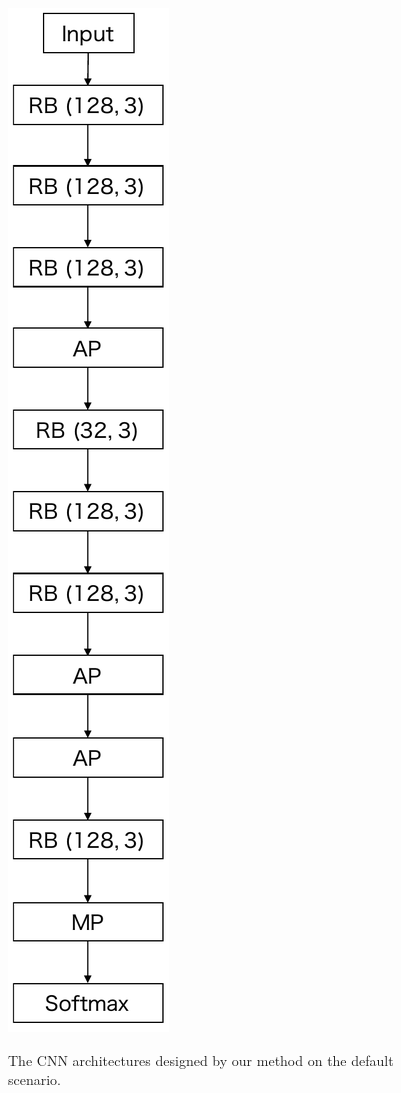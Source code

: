 \begin{figure}[t]
\begin{minipage}[b]{0.45\linewidth}
  \includegraphics[keepaspectratio, scale=0.4, bb=0 0 128 814]{images/modelB.pdf}
  \label{modelB}
 \end{minipage}
 \caption{The CNN architectures designed by our method on the default scenario.}\label{models}
\end{figure}

